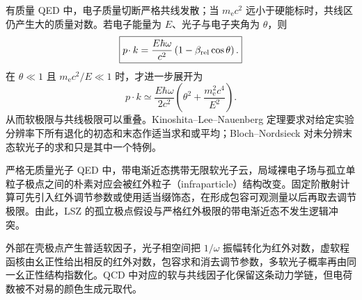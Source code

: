 有质量 QED 中，电子质量切断严格共线发散；当 $m_{\mathrm e} c^2$ 远小于硬能标时，共线区仍产生大的质量对数。若电子能量为 $E$、光子与电子夹角为 $\theta$，则
\begin{equation}
 \boxed{
 p\!\cdot k
 =\frac{E\hbar\omega}{c^2}
 \left(1-\beta_{\rm rel}\cos\theta\right).}
 \label{eq:soft-collinear-dot-exact-dp68}
\end{equation}
在 $\theta\ll1$ 且 $m_{\mathrm e} c^2/E\ll1$ 时，才进一步展开为
\begin{equation}
 \boxed{
 p\!\cdot k
 \simeq
 \frac{E\hbar\omega}{2c^2}
 \left(\theta^2+\frac{m_{\mathrm e}^2c^4}{E^2}\right).}
 \label{eq:soft-collinear-denominator-dp10}
\end{equation}
从而软极限与共线极限可以重叠。Kinoshita--Lee--Nauenberg 定理要求对给定实验分辨率下所有退化的初态和末态作适当求和或平均；Bloch--Nordsieck 对未分辨末态软光子的求和只是其中一个特例。

\begin{note}
严格无质量光子 QED 中，带电渐近态携带无限软光子云，局域裸电子场与孤立单粒子极点之间的朴素对应会被红外粒子（infraparticle）结构改变。固定阶散射计算可先引入红外调节参数或使用适当缀饰态，在形成包容可观测量以后再取去调节极限。由此，LSZ 的孤立极点假设与严格红外极限的带电渐近态不发生逻辑冲突。
\end{note}

外部在壳极点产生普适软因子，光子相空间把 $1/\omega$ 振幅转化为红外对数，虚软程函核由幺正性给出相反的红外对数，包容求和消去调节参数，多软光子概率再由同一幺正性结构指数化。QCD 中对应的软与共线因子化保留这条动力学链，但电荷数被不对易的颜色生成元取代。

